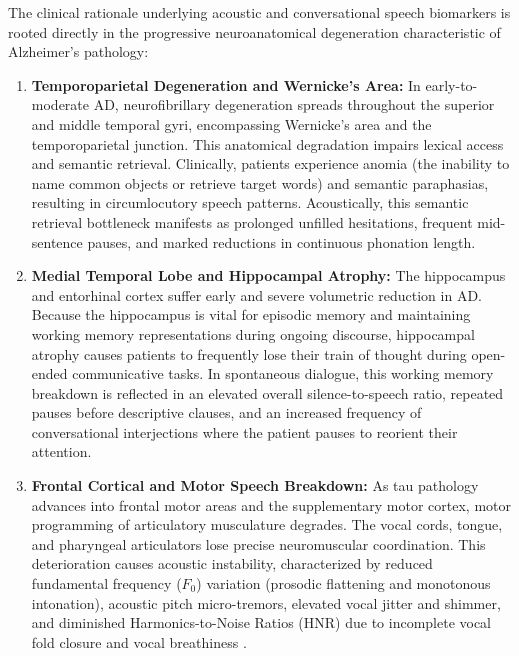 \documentclass[conference]{IEEEtran}
\begin{document}
The clinical rationale underlying acoustic and conversational speech biomarkers is rooted directly in the progressive neuroanatomical degeneration characteristic of Alzheimer's pathology:
\begin{enumerate}
    \item \textbf{Temporoparietal Degeneration and Wernicke's Area:} In early-to-moderate AD, neurofibrillary degeneration spreads throughout the superior and middle temporal gyri, encompassing Wernicke's area and the temporoparietal junction. This anatomical degradation impairs lexical access and semantic retrieval. Clinically, patients experience anomia (the inability to name common objects or retrieve target words) and semantic paraphasias, resulting in circumlocutory speech patterns. Acoustically, this semantic retrieval bottleneck manifests as prolonged unfilled hesitations, frequent mid-sentence pauses, and marked reductions in continuous phonation length.
    \item \textbf{Medial Temporal Lobe and Hippocampal Atrophy:} The hippocampus and entorhinal cortex suffer early and severe volumetric reduction in AD. Because the hippocampus is vital for episodic memory and maintaining working memory representations during ongoing discourse, hippocampal atrophy causes patients to frequently lose their train of thought during open-ended communicative tasks. In spontaneous dialogue, this working memory breakdown is reflected in an elevated overall silence-to-speech ratio, repeated pauses before descriptive clauses, and an increased frequency of conversational interjections where the patient pauses to reorient their attention.
    \item \textbf{Frontal Cortical and Motor Speech Breakdown:} As tau pathology advances into frontal motor areas and the supplementary motor cortex, motor programming of articulatory musculature degrades. The vocal cords, tongue, and pharyngeal articulators lose precise neuromuscular coordination. This deterioration causes acoustic instability, characterized by reduced fundamental frequency ($F_0$) variation (prosodic flattening and monotonous intonation), acoustic pitch micro-tremors, elevated vocal jitter and shimmer, and diminished Harmonics-to-Noise Ratios (HNR) due to incomplete vocal fold closure and vocal breathiness \cite{cummins2018review, haider2020assessment}.
\end{enumerate}
\end{document}
